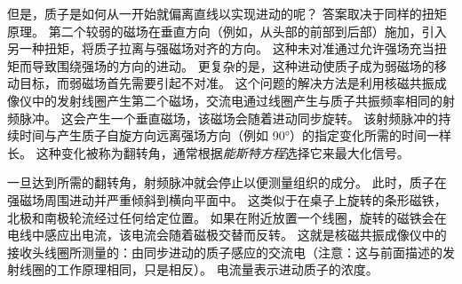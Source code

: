 但是，质子是如何从一开始就偏离直线以实现进动的呢？ 
答案取决于同样的扭矩原理。 
第二个较弱的磁场在垂直方向（例如，从头部的前部到后部）施加，引入另一种扭矩，将质子拉离与强磁场对齐的方向。
这种未对准通过允许强场充当扭矩而导致围绕强场的方向的进动。
更复杂的是，这种进动使质子成为弱磁场的移动目标，而弱磁场首先需要引起不对准。
这个问题的解决方法是利用核磁共振成像仪中的发射线圈产生第二个磁场，交流电通过线圈产生与质子共振频率相同的射频脉冲。
这会产生一个垂直磁场，该磁场会随着进动同步旋转。
该射频脉冲的持续时间与产生质子自旋方向远离强场方向（例如 90°）的指定变化所需的时间一样长。
这种变化被称为翻转角，通常根据\textit{能斯特方程}选择它来最大化信号。


一旦达到所需的翻转角，射频脉冲就会停止以便测量组织的成分。
此时，质子在强磁场周围进动并严重倾斜到横向平面中。
这类似于在桌子上旋转的条形磁铁，北极和南极轮流经过任何给定位置。
如果在附近放置一个线圈，旋转的磁铁会在电线中感应出电流，该电流会随着磁极交替而反转。
这就是核磁共振成像仪中的接收头线圈所测量的：由同步进动的质子感应的交流电（注意：这与前面描述的发射线圈的工作原理相同，只是相反）。
电流量表示进动质子的浓度。


